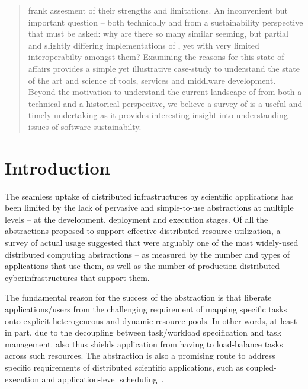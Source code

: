 \documentclass{sig-alternate}
\begin{document}
\begin{abstract}
  frank assesment of their strengths and limitations.  An inconvenient
  but important question -- both technically and from a sustainability
  perspective that must be asked: why are there so many similar
  seeming, but partial and slightly differing implementations of
  \pilotjobs, yet with very limited interoperabilty amongst them?
  Examining the reasons for this state-of-affairs provides a simple
  yet illustrative case-study to understand the state of the art and
  science of tools, services and middlware development.  Beyond the
  motivation to understand the current landscape of \pilotjobs from
  both a technical and a historical perspecitve, we believe a survey
  of \pilotjobs is a useful and timely undertaking as it provides
  interesting insight into understanding issues of software
  sustainabilty.
\end{abstract}

\section{Introduction} 

  
The seamless uptake of distributed infrastructures by scientific
applications has been limited by the lack of pervasive and
simple-to-use abstractions at multiple levels – at the development,
deployment and execution stages. Of all the abstractions proposed to
support effective distributed resource utilization, a survey of actual
usage suggested that \pilotjobs were arguably one of the most
widely-used distributed computing abstractions – as measured by the
number and types of applications that use them, as well as the number
of production distributed cyberinfrastructures that support them.


The fundamental reason for the success of the \pilotjob abstraction is
that \pilotjob liberate applications/users from the challenging
requirement of mapping specific tasks onto explicit heterogeneous and
dynamic resource pools.  In other words, at least in part, due to the
decoupling between task/workload specification and task management.
\pilotjobs also thus shields application from having to load-balance
tasks across such resources.  The \pilotjob abstraction is also a
promising route to address specific requirements of distributed
scientific applications, such as coupled-execution and
application-level scheduling~\cite{ko-
  efficient,DBLP:conf/hpdc/KimHMAJ10}.
\end{document}
